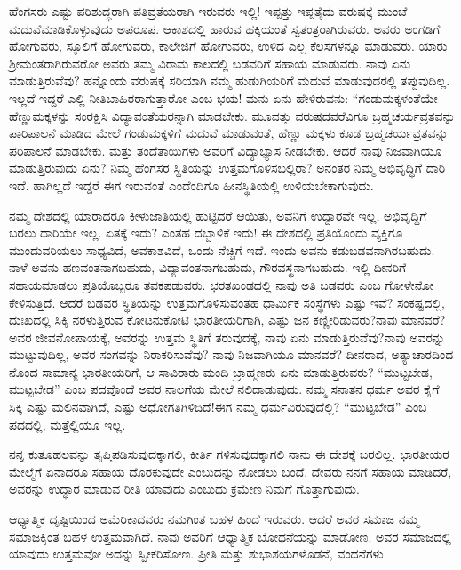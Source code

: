 ಹೆಂಗಸರು ಎಷ್ಟು ಪರಿಶುದ್ಧರಾಗಿ ಪತಿವ್ರತೆಯರಾಗಿ ಇರುವರು ಇಲ್ಲಿ! ಇಪ್ಪತ್ತು ಇಪ್ಪತೈದು ವರುಷಕ್ಕೆ ಮುಂಚೆ ಮದುವೆಮಾಡಿಕೊಳ್ಳುವುದು ಅಪರೂಪ. ಆಕಾಶದಲ್ಲಿ ಹಾರುವ ಹಕ್ಕಿಯಂತೆ ಸ್ವತಂತ್ರರಾಗಿರುವರು. ಅವರು ಅಂಗಡಿಗೆ ಹೋಗುವರು, ಸ್ಕೂಲಿಗೆ ಹೋಗುವರು, ಕಾಲೇಜಿಗೆ ಹೋಗುವರು, ಉಳಿದ ಎಲ್ಲ ಕೆಲಸಗಳನ್ನೂ ಮಾಡುವರು. ಯಾರು ಶ‍್ರೀಮಂತರಾಗಿರುವರೋ ಅವರು ತಮ್ಮ ವಿರಾಮ ಕಾಲದಲ್ಲಿ ಬಡವರಿಗೆ ಸಹಾಯ ಮಾಡುವರು. ನಾವು ಏನು ಮಾಡುತ್ತಿರುವೆವು? ಹನ್ನೊಂದು ವರುಷಕ್ಕೆ ಸರಿಯಾಗಿ ನಮ್ಮ ಹುಡುಗಿಯರಿಗೆ ಮದುವೆ ಮಾಡುವುದರಲ್ಲಿ ತಪ್ಪುವುದಿಲ್ಲ. ಇಲ್ಲದೆ ಇದ್ದರೆ ಎಲ್ಲಿ ನೀತಿಬಾಹಿರರಾಗುತ್ತಾರೋ ಎಂಬ ಭಯ! ಮನು ಏನು ಹೇಳಿರುವನು: “ಗಂಡುಮಕ್ಕಳಂತೆಯೇ ಹೆಣ್ಣುಮಕ್ಕಳನ್ನು ಸಂರಕ್ಷಿಸಿ ವಿದ್ಯಾವಂತೆಯರನ್ನಾಗಿ ಮಾಡಬೇಕು. ಮೂವತ್ತು ವರುಷದವರೆವಿಗೂ ಬ್ರಹ್ಮಚರ್ಯವ್ರತವನ್ನು ಪಾರಿಪಾಲನೆ ಮಾಡಿದ ಮೇಲೆ ಗಂಡುಮಕ್ಕಳಿಗೆ ಮದುವೆ ಮಾಡುವಂತೆ, ಹೆಣ್ಣು ಮಕ್ಕಳು ಕೂಡ ಬ್ರಹ್ಮಚರ್ಯವ್ರತವನ್ನು ಪರಿಪಾಲನೆ ಮಾಡಬೇಕು. ಮತ್ತು ತಂದೆತಾಯಿಗಳು ಅವರಿಗೆ ವಿದ್ಯಾಭ್ಯಾಸ ನೀಡಬೇಕು. ಆದರೆ ನಾವು ನಿಜವಾಗಿಯೂ ಮಾಡುತ್ತಿರುವುದು ಏನು? ನಿಮ್ಮ ಹೆಂಗಸರ ಸ್ಥಿತಿಯನ್ನು ಉತ್ತಮಗೊಳಿಸಬಲ್ಲಿರಾ? ಅನಂತರ ನಿಮ್ಮ ಅಭಿವೃದ್ಧಿಗೆ ದಾರಿ ಇದೆ. ಹಾಗಿಲ್ಲದೆ ಇದ್ದರೆ ಈಗ ಇರುವಂತೆ ಎಂದೆಂದಿಗೂ ಹೀನಸ್ಥಿತಿಯಲ್ಲಿ ಉಳಿಯಬೇಕಾಗುವುದು.

ನಮ್ಮ ದೇಶದಲ್ಲಿ ಯಾರಾದರೂ ಕೀಳುಜಾತಿಯಲ್ಲಿ ಹುಟ್ಟಿದರೆ ಆಯಿತು, ಅವನಿಗೆ ಉದ್ದಾರವೇ ಇಲ್ಲ, ಅಭಿವೃದ್ಧಿಗೆ ಬರಲು ದಾರಿಯೇ ಇಲ್ಲ. ಏತಕ್ಕೆ ಇದು? ಎಂತಹ ದಬ್ಬಾಳಿಕೆ ಇದು! ಈ ದೇಶದಲ್ಲಿ ಪ್ರತಿಯೊಂದು ವ್ಯಕ್ತಿಗೂ ಮುಂದುವರಿಯಲು ಸಾಧ್ಯವಿದೆ, ಅವಕಾಶವಿದೆ, ಒಂದು ನೆಚ್ಚಿಗೆ ಇದೆ. ಇಂದು ಅವನು ಕಡುಬಡವನಾಗಿರಬಹುದು. ನಾಳೆ ಅವನು ಹಣವಂತನಾಗಬಹುದು, ವಿದ್ಯಾವಂತನಾಗಬಹುದು, ಗೌರವಸ್ಥನಾಗಬಹುದು. ಇಲ್ಲಿ ದೀನರಿಗೆ ಸಹಾಯಮಾಡಲು ಪ್ರತಿಯೊಬ್ಬರೂ ತವಕಪಡುವರು. ಭರತಖಂಡದಲ್ಲಿ ನಾವು ಅತಿ ಬಡವರು ಎಂಬ ಗೋಳೇನೋ ಕೇಳಿಸುತ್ತಿದೆ. ಆದರೆ ಬಡವರ ಸ್ಥಿತಿಯನ್ನು ಉತ್ತಮಗೊಳಿಸುವಂತಹ ಧಾರ್ಮಿಕ ಸಂಸ್ಥೆಗಳು ಎಷ್ಟು ಇವೆ? ಸಂಕಷ್ಟದಲ್ಲಿ, ದುಃಖದಲ್ಲಿ ಸಿಕ್ಕಿ ನರಳುತ್ತಿರುವ ಕೋಟನುಕೋಟಿ ಭಾರತೀಯರಿಗಾಗಿ, ಎಷ್ಟು ಜನ ಕಣ್ಣೀರಿಡುವರು?ನಾವು ಮಾನವರೆ? ಅವರ ಜೀವನೋಪಾಯಕ್ಕೆ, ಅವರನ್ನು ಉತ್ತಮ ಸ್ಥಿತಿಗೆ ತರುವುದಕ್ಕೆ, ನಾವು ಏನು ಮಾಡುತ್ತಿರುವೆವು?ನಾವು ಅವರನ್ನು ಮುಟ್ಟುವುದಿಲ್ಲ, ಅವರ ಸಂಗವನ್ನು ನಿರಾಕರಿಸುವೆವು? ನಾವು ನಿಜವಾಗಿಯೂ ಮಾನವರೆ? ದೀನರಾದ, ಅತ್ಯಾಚಾರದಿಂದ ನೊಂದ ಸಾಮಾನ್ಯ ಭಾರತೀಯರಿಗೆ, ಆ ಸಾವಿರಾರು ಮಂದಿ ಬ್ರಾಹ್ಮಣರು ಏನು ಮಾಡುತ್ತಿರುವರು? “ಮುಟ್ಟಬೇಡ, ಮುಟ್ಟಬೇಡ” ಎಂಬ ಪದವೊಂದೆ ಅವರ ನಾಲಗೆಯ ಮೇಲೆ ನಲಿದಾಡುವುದು. ನಮ್ಮ ಸನಾತನ ಧರ್ಮ ಅವರ ಕೈಗೆ ಸಿಕ್ಕಿ ಎಷ್ಟು ಮಲಿನವಾಗಿದೆ, ಎಷ್ಟು ಅಧೋಗತಿಗಿಳಿದಿದೆ!ಈಗ ನಮ್ಮ ಧರ್ಮವಿರುವುದೆಲ್ಲಿ? “ಮುಟ್ಟಬೇಡ” ಎಂಬ ಪದದಲ್ಲಿ, ಮತ್ತೆಲ್ಲಿಯೂ ಇಲ್ಲ.

ನನ್ನ ಕುತೂಹಲವನ್ನು ತೃಪ್ತಿಪಡಿಸುವುದಕ್ಕಾಗಲಿ, ಕೀರ್ತಿ ಗಳಿಸುವುದಕ್ಕಾಗಲಿ ನಾನು ಈ ದೇಶಕ್ಕೆ ಬರಲಿಲ್ಲ. ಭಾರತೀಯರ ಮೇಲ್ಮೆಗೆ ಏನಾದರೂ ಸಹಾಯ ದೊರಕುವುದೇ ಎಂಬುದನ್ನು ನೋಡಲು ಬಂದೆ. ದೇವರು ನನಗೆ ಸಹಾಯ ಮಾಡಿದರೆ, ಅವರನ್ನು ಉದ್ಧಾರ ಮಾಡುವ ರೀತಿ ಯಾವುದು ಎಂಬುದು ಕ್ರಮೇಣ ನಿಮಗೆ ಗೊತ್ತಾಗುವುದು.

ಆಧ್ಯಾತ್ಮಿಕ ದೃಷ್ಟಿಯಿಂದ ಅಮೆರಿಕಾದವರು ನಮಗಿಂತ ಬಹಳ ಹಿಂದೆ ಇರುವರು. ಆದರೆ ಅವರ ಸಮಾಜ ನಮ್ಮ ಸಮಾಜಕ್ಕಿಂತ ಬಹಳ ಉತ್ತಮವಾಗಿದೆ. ನಾವು ಅವರಿಗೆ ಆಧ್ಯಾತ್ಮಿಕ ಬೋಧನೆಯನ್ನು ಮಾಡೋಣ. ಅವರ ಸಮಾಜದಲ್ಲಿ ಯಾವುದು ಉತ್ತಮವೋ ಅದನ್ನು ಸ್ವೀಕರಿಸೋಣ. ಪ್ರೀತಿ ಮತ್ತು ಶುಭಾಶಯಗಳೊಡನೆ, ವಂದನೆಗಳು.

